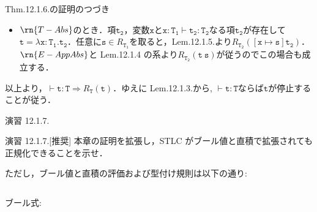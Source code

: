 \documentclass[9pt]{beamer}
\begin{document}
\begin{frame}{Thm.12.1.6.の証明のつづき}
\begin{itemize}
\item $\rn{T-Abs}$のとき．項$\mathtt{t_{2}}$，変数$\mathtt{x}$と$\mathtt{x:T_{1}\vdash t_{2}:T_{2}}$なる項$\mathtt{t_{2}}$が存在して$\mathtt{t = \lambda x:T_{1}.t_{2}}$．任意に$\mathtt{s}\in R_{\mathtt{T_{1}}}$を取ると，Lem.12.1.5.より$R_{\mathtt{T_{2}}}(\mathtt{[x\mapsto s]t_{2}})$．$\rn{E-AppAbs}$と Lem.12.1.4 の系より$R_{\mathtt{T_{2}}}(\mathtt{t\ s})$が従うのでこの場合も成立する．
\end{itemize}
以上より，$\vdash\mathtt{t:T}\Rightarrow R_{\mathtt{T}}(\mathtt{t})$．ゆえに Lem.12.1.3.から, $\vdash\mathtt{t:T}$ならば$\mathtt{t}$が停止することが従う．
\end{frame}
\begin{frame}{演習 12.1.7.}
\begin{alertblock}{演習 12.1.7.[推奨]}
本章の証明を拡張し，STLC がブール値と直積で拡張されても正規化できることを示せ．
\end{alertblock}
ただし，ブール値と直積の評価および型付け規則は以下の通り:\begin{columns}\begin{column}{0.5\columnwidth}
ブール式:
\end{column}\begin{column}{0.5\columnwidth}
\end{column}
\end{columns}
\end{frame}
\end{document}

